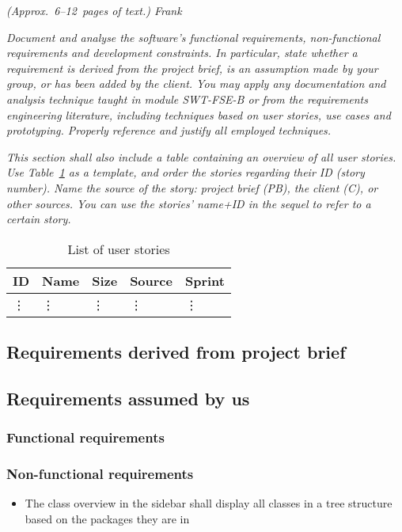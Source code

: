 \emph{(Approx.~6--12~pages of text.) Frank}

\emph{Document and analyse the software's functional requirements, 
non-functional requirements and development constraints. In particular, state 
whether a requirement is derived from the project brief, is an assumption made 
by your group, or has been added by the client. You may apply any documentation 
and analysis technique taught in module SWT-FSE-B or from the 
requirements engineering literature, including techniques based on user stories, 
use cases and prototyping. Properly reference and justify all employed 
techniques.}

\emph{This section shall also include a table containing an overview of all user 
stories. Use Table~\ref{tab:user_stories} as a template, and order the stories 
regarding their ID (story number). Name the source of the story: project brief 
(PB), the client (C), or other sources. You can use the stories' name+ID in the 
sequel to refer to a certain story.}

\begin{table}[!h]
  \caption{List of user stories}
  \centering
  \begin{tabular}{l||l|l|l|l|}
    ID & Name & Size &  Source & Sprint\\
    \hline
    \vdots&\vdots&\vdots&\vdots&\vdots\\
  \end{tabular}
  \label{tab:user_stories}
\end{table}

\subsection{Requirements derived from project brief}

\subsection{Requirements assumed by us}
\subsubsection{Functional requirements}

\subsubsection{Non-functional requirements}
\begin{itemize}
\item The class overview in the sidebar shall display all classes in a tree structure based on the packages they are in
\end{itemize}
